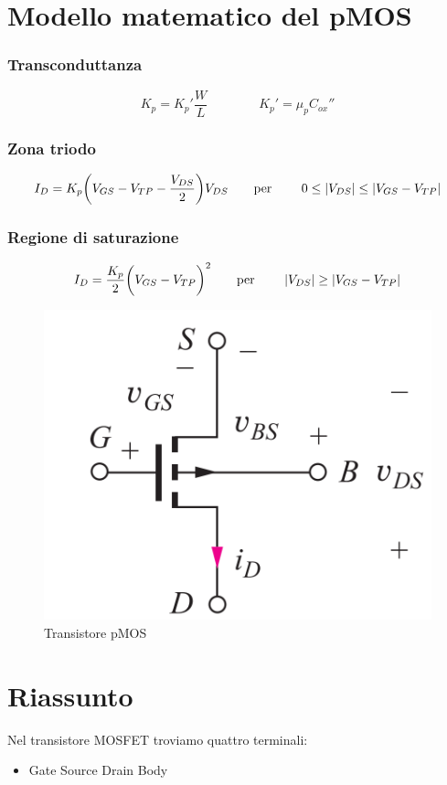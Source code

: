 \section{Modello matematico del pMOS}

\subsubsection{Transconduttanza}

\begin{equation*}
    K_p = K_p'\frac{W}{L}\qquad\qquad K_p' = \mu_pC_{ox}''
\end{equation*}

\subsubsection{Zona triodo}
\begin{equation*}
    I_D = K_p\biggl(V_{GS}-V_{TP}-\frac{V_{DS}}{2}\biggl)V_{DS} \qquad\text{per } \qquad0\leq |V_{DS}|\leq |V_{GS} - V_{TP}|
\end{equation*}

 \subsubsection{Regione di saturazione}
\begin{equation*}
    I_D = \frac{K_p}{2}\biggl(V_{GS}-V_{TP}\biggl)^2 \qquad\text{per } \qquad |V_{DS}| \geq |V_{GS} - V_{TP}|
\end{equation*}

\begin{figure}[htbp]
    \centering
    \includegraphics[width=0.27\linewidth]{img/p_mos.png}
    \caption{Transistore pMOS}    
\end{figure}


\section{Riassunto}

Nel transistore MOSFET troviamo quattro terminali: 

\begin{itemize}
    \centering
    \item[] Gate \qquad \qquad Source \qquad \qquad Drain \qquad \qquad Body
\end{itemize}

